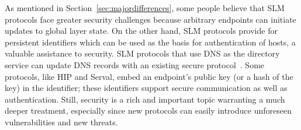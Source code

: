 As
mentioned in Section~\ref{sec:majordifferences}, some people believe that
SLM protocols face greater security challenges
because arbitrary endpoints can initiate updates to global layer state.
On the other hand, SLM protocols provide for persistent identifiers
which can be used as the basis for authentication of hosts, a valuable
assistance to security.
SLM protocols that use DNS as the directory
service can update DNS
records with an existing secure protocol~\cite{RFC-2137}.  
Some protocols, like HIP and Serval, embed
an endpoint's public key (or a hash of the key) in the identifier; 
these identifiers support secure communication as well as
authentication.
Still, security is a rich and
important topic warranting a much deeper treatment, especially since
new protocols can easily introduce unforeseen vulnerabilities and new
threats.
